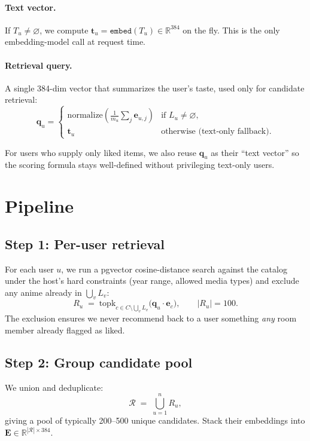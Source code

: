 \documentclass[11pt]{article}
\begin{document}
\paragraph{Text vector.}
If $T_u \neq \varnothing$, we compute
$\mathbf{t}_u = \texttt{embed}(T_u) \in \mathbb{R}^{384}$ on the fly.
This is the only embedding-model call at request time.

\paragraph{Retrieval query.}
A single 384-dim vector that summarizes the user's taste, used only
for candidate retrieval:
\[
  \mathbf{q}_u =
  \begin{cases}
    \mathrm{normalize}\!\left(\tfrac{1}{m_u}\sum_{j} \mathbf{e}_{u,j}\right) & \text{if } L_u \neq \varnothing, \\[4pt]
    \mathbf{t}_u & \text{otherwise (text-only fallback).}
  \end{cases}
\]

For users who supply only liked items, we also reuse $\mathbf{q}_u$ as
their ``text vector'' so the scoring formula stays well-defined without
privileging text-only users.

\section{Pipeline}

\subsection{Step 1: Per-user retrieval}

For each user $u$, we run a pgvector cosine-distance search against the
catalog under the host's hard constraints (year range, allowed media
types) and exclude any anime already in $\bigcup_v L_v$:
\[
  R_u \;=\; \mathrm{topk}_{c \in C \setminus \bigcup_v L_v}\bigl(
    \mathbf{q}_u \cdot \mathbf{e}_c
  \bigr),\qquad |R_u| = 100.
\]
The exclusion ensures we never recommend back to a user something
\emph{any} room member already flagged as liked.

\subsection{Step 2: Group candidate pool}

We union and deduplicate:
\[
  \mathcal{R} \;=\; \bigcup_{u=1}^{n} R_u,
\]
giving a pool of typically 200--500 unique candidates. Stack their
embeddings into $\mathbf{E} \in \mathbb{R}^{|\mathcal{R}| \times 384}$.
\end{document}
